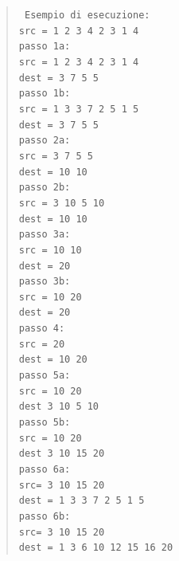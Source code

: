 \documentclass[binding=0.6cm, noexaminfo]{sapthesis}\usepackage{microtype}
\begin{document}
\begin{quote}\texttt{
    Esempio di esecuzione: \\
    src = 1 2 3 4 2 3 1 4\\
    passo 1a: \\
    src = 1 2 3 4 2 3 1 4\\
    dest = 3 7 5 5\\ 
    passo 1b: \\
    src = 1 3 3 7 2 5 1 5\\
    dest = 3 7 5 5\\ 
    passo 2a: \\
    src = 3 7 5 5\\ 
    dest = 10 10 \\
    passo 2b: \\
    src = 3 10 5 10\\ 
    dest = 10 10 \\
    passo 3a: \\
    src = 10 10 \\
    dest = 20\\
    passo 3b: \\
    src = 10 20 \\
    dest = 20\\
    passo 4: \\
    src = 20 \\
    dest = 10 20 \\ 
    passo 5a: \\
    src = 10 20 \\ 
    dest 3 10 5 10 \\ 
    passo 5b: \\
    src = 10 20 \\ 
    dest 3 10 15 20 \\ 
    passo 6a: \\
    src=  3 10 15 20 \\ 
    dest = 1 3 3 7 2 5 1 5\\
    passo 6b: \\
    src=  3 10 15 20 \\ 
    dest = 1 3 6 10 12 15 16 20\\
    }

\end{quote}
\end{document}
